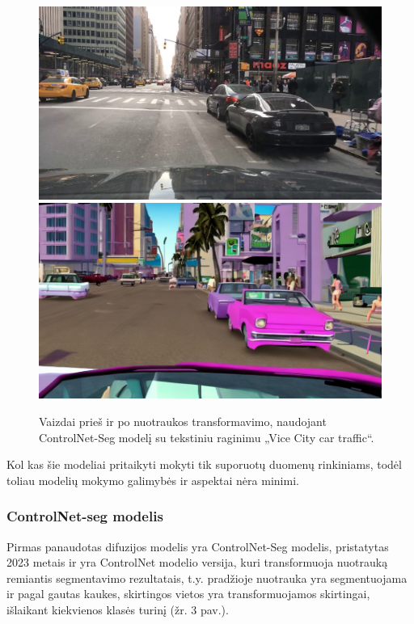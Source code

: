 \documentclass{VUMIFPSbakalaurinis}
\begin{document}
        \begin{figure}[H]
            \centering
            \includegraphics[scale=0.3]{img/diffusion/controlnet/before}
            \includegraphics[scale=0.4287]{img/diffusion/controlnet/after}
            \caption{Vaizdai prieš ir po nuotraukos transformavimo, naudojant ControlNet-Seg modelį su tekstiniu raginimu „Vice City car traffic“.\cite{ControlNetSeg}}
            \label{img:mlp}
        \end{figure}

        Kol kas šie modeliai pritaikyti mokyti tik suporuotų duomenų rinkiniams, todėl toliau modelių mokymo galimybės ir aspektai nėra minimi. 
        
        \subsubsection{ControlNet-seg modelis}
            Pirmas panaudotas difuzijos modelis yra ControlNet-Seg \cite{ControlNetSeg} modelis, pristatytas 2023 metais ir yra ControlNet modelio \cite{ControlNet} versija, kuri transformuoja nuotrauką remiantis segmentavimo rezultatais, t.y. pradžioje nuotrauka yra segmentuojama ir pagal gautas kaukes, skirtingos vietos yra transformuojamos skirtingai, išlaikant kiekvienos klasės turinį (žr. 3 pav.).
\end{document}

